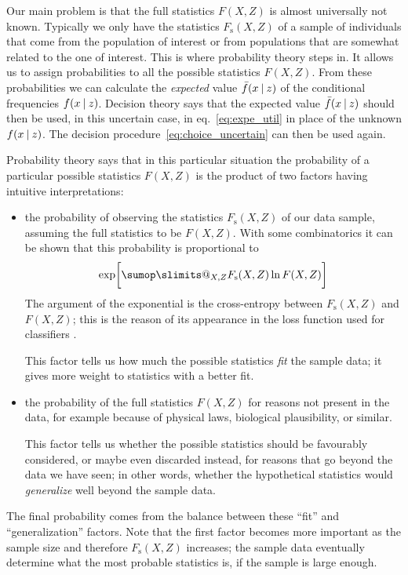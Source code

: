 \documentclass[\ifafour a4paper,12pt,\else a5paper,10pt,\fi%
onecolumn,oneside,article,%
british%
]{memoir}
\makeatletter
\theoremstyle{remark}
\theoremstyle{innote}
\def\sum{\DOTSI\sumop\slimits@}
\renewcommand*{\|}[1][]{\nonscript\:#1\vert\nonscript\:\mathopen{}}
\newcommand*{\eqn}{eq.}%
\newcommand*{\Fs}{F_{\textrm{s}}}
\newcommand*{\uf}{\bar{f}}
\makeatother
\begin{document}
Our main problem is that the full statistics $F(X,Z)$ is almost universally not known. Typically we only have the statistics $\Fs(X,Z)$ of a sample of individuals that come from the population of interest or from populations that are somewhat related to the one of interest. This is where probability theory steps in. It allows us to assign probabilities to all the possible statistics $F(X,Z)$. From these probabilities we can calculate the \emph{expected} value $\uf(x \| z)$ of the conditional frequencies $f(x \| z)$. Decision theory says that the expected value $\uf(x \| z)$ should then be used, in this uncertain case, in \eqn~\eqref{eq:expe_util} in place of the unknown $f(x \| z)$. The decision procedure~\eqref{eq:choice_uncertain} can then be used again.

Probability theory says that in this particular situation the probability of a particular possible statistics $F(X,Z)$ is the product of two factors having intuitive interpretations:
\begin{itemize}
\item the probability of observing the statistics $\Fs(X,Z)$ of our data sample, assuming the full statistics to be $F(X,Z)$. With some combinatorics it can be shown that this probability is proportional to
  \begin{equation}
    \label{eq:likelihood_relentropy}
    \exp\biggl[\sum_{X,Z}\Fs(X,Z) \ln F(X,Z)\biggr]
  \end{equation}
  The argument of the exponential is the cross-entropy between $\Fs(X,Z)$ and $F(X,Z)$; this is the reason of its appearance in the loss function used for classifiers \autocites{bridle1990,mackay1992d}.

  This factor tells us how much the possible statistics \emph{fit} the sample data; it gives more weight to statistics with a better fit.
  
\item the probability of the full statistics $F(X,Z)$ for reasons not present in the data, for example because of physical laws, biological plausibility, or similar.

This factor tells us whether the possible statistics should be favourably considered, or maybe even discarded instead, for reasons that go beyond the data we have seen; in other words, whether the hypothetical statistics would \emph{generalize} well beyond the sample data.  
\end{itemize}
The final probability comes from the balance between these \enquote{fit} and \enquote{generalization} factors. Note that the first factor becomes more important as the sample size and therefore $\Fs(X,Z)$ increases; the sample data eventually determine what the most probable statistics is, if the sample is large enough.
\end{document}
